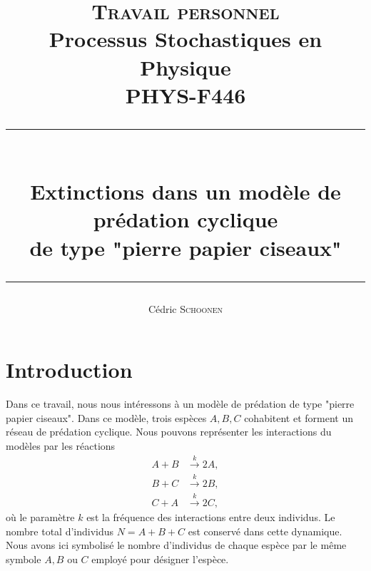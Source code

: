 \documentclass[openany,a4paper,12pt]{article}
\title{
\textsc{Travail personnel}\\ 
Processus Stochastiques en Physique\\
PHYS-F446\\
\rule{\linewidth}{1pt} \\
\vspace{3mm}
Extinctions dans un modèle de prédation cyclique \\
de type "pierre papier ciseaux"\\
\rule{\linewidth}{1pt}
}
\author{Cédric \textsc{Schoonen}}
\begin{document}
\maketitle
\vspace{2cm}

\tableofcontents

\newpage





\section{Introduction}
\label{section_introduction}

\par Dans ce travail, nous nous intéressons à un modèle de prédation de type "pierre papier ciseaux". Dans ce modèle, trois espèces $A,B,C$ cohabitent et forment un réseau de prédation cyclique. Nous pouvons représenter les interactions du modèles par les réactions
%
\begin{equation}\label{reactions_k}
\begin{split}
	A + B & \overset{k}{\longrightarrow} 2A, \\
	B + C & \overset{k}{\longrightarrow} 2B, \\
	C + A & \overset{k}{\longrightarrow} 2C, 
\end{split}
\end{equation}
%
où le paramètre $k$ est la fréquence des interactions entre deux individus. Le nombre total d'individus $N=A+B+C$ est conservé dans cette dynamique. Nous avons ici symbolisé le nombre d'individus de chaque espèce par le même symbole $A,B$ ou $C$ employé pour désigner l'espèce.
\end{document}
